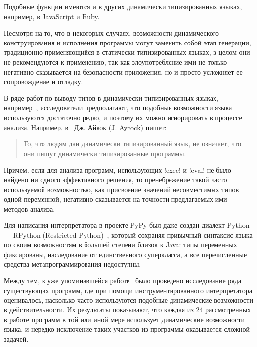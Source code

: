 \begin{description}
      Подобные функции имеются и в других динамически типизированных языках,
      например, в JavaScript и Ruby.

      Несмотря на то, что в некоторых случаях, возможности
      динамического конструирования и исполнения программы могут заменить собой
      этап генерации, традиционно применяющийся в статически типизированных
      языках, в целом они не рекомендуются к применению, так как злоупотребление
      ими не только негативно сказывается на безопасности приложения,
      но и просто усложняет ее сопровождение и отладку.

\end{description}

В ряде работ по выводу типов в динамически типизированных языках,
например~\cite{Salib2004,Aycock2000}, исследователи предполагают, что подобные
возможности языка используются достаточно редко, и поэтому их можно игнорировать
в процессе анализа.  Например, в~\cite{Aycock2000} Дж. Айкок (J. Aycock) пишет:

\begin{quote} 
  

  То, что людям дан динамически типизированный язык, не означает, что они пишут
  динамически типизированные программы.

\end{quote}

Причем, если для анализа программ, использующих !exec! и !eval! не было найдено
ни одного эффективного решения, то пренебрежение такой часто используемой
возможностью, как присвоение значений несовместимых типов одной переменной,
негативно сказывается на точности предлагаемых ими методов анализа. 

Для написания интерпретатора в проекте PyPy был даже создан диалект Python ---
RPython (Restricted Python)~\cite{Ancona2007}, который сохраняя привычный
синтаксис языка по своим возможностям в большей степени близок к Java: типы
переменных фиксированы, наследование от единственного суперкласса, а все
перечисленные средства метапрограммирования недоступны. 

Между тем, в уже упоминавшейся работе~\cite{Holkner2009} было проведено
исследование ряда существующих программ, где при помощи инструментированного
интерпретатора оценивалось, насколько часто используются подобные динамические
возможности в действительности. Их результаты показывают, что каждая из 24
рассмотренных в работе программ в той или иной мере использует динамические
возможности языка, и нередко исключение таких участков из программы оказывается 
сложной задачей.


